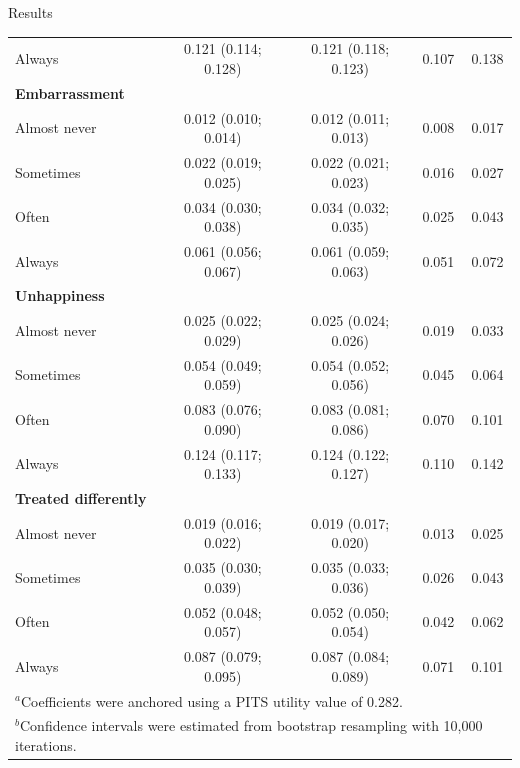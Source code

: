 \documentclass[t,compress,9pt,aspectratio=169]{beamer}
\begin{document}
\begin{frame}{Results}
{\begin{table}[h]
\begin{tabular}{lcccc}
\quad Always & 0.121 (0.114; 0.128) & 0.121 (0.118; 0.123) & 0.107 & 0.138 \\
\textbf{Embarrassment} &  &  &  &  \\
\quad Almost never & 0.012 (0.010; 0.014) & 0.012 (0.011; 0.013) & 0.008 & 0.017 \\
\quad Sometimes & 0.022 (0.019; 0.025) & 0.022 (0.021; 0.023) & 0.016 & 0.027 \\
\quad Often & 0.034 (0.030; 0.038) & 0.034 (0.032; 0.035) & 0.025 & 0.043 \\
\quad Always & 0.061 (0.056; 0.067) & 0.061 (0.059; 0.063) & 0.051 & 0.072 \\
\textbf{Unhappiness} &  &  &  &  \\
\quad Almost never & 0.025 (0.022; 0.029) & 0.025 (0.024; 0.026) & 0.019 & 0.033 \\
\quad Sometimes & 0.054 (0.049; 0.059) & 0.054 (0.052; 0.056) & 0.045 & 0.064 \\
\quad Often & 0.083 (0.076; 0.090) & 0.083 (0.081; 0.086) & 0.070 & 0.101 \\
\quad Always & 0.124 (0.117; 0.133) & 0.124 (0.122; 0.127) & 0.110 & 0.142 \\
\textbf{Treated differently} &  &  &  &  \\
\quad Almost never & 0.019 (0.016; 0.022) & 0.019 (0.017; 0.020) & 0.013 & 0.025 \\
\quad Sometimes & 0.035 (0.030; 0.039) & 0.035 (0.033; 0.036) & 0.026 & 0.043 \\
\quad Often & 0.052 (0.048; 0.057) & 0.052 (0.050; 0.054) & 0.042 & 0.062 \\
\quad Always & 0.087 (0.079; 0.095) & 0.087 (0.084; 0.089) & 0.071 & 0.101 \\
\hline
\multicolumn{5}{l}{\(^a\)Coefficients were anchored using a PITS utility value of 0.282.} \\
\multicolumn{5}{l}{\(^b\)Confidence intervals were estimated from bootstrap resampling with 10,000 iterations.} \\
\end{tabular}
\end{table}
}
   
\end{frame}
\end{document}
